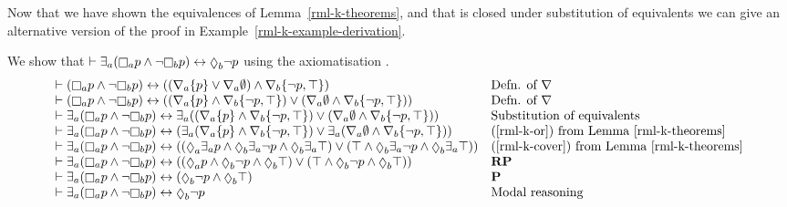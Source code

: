 Now that we have shown the equivalences of Lemma~\ref{rml-k-theorems}, and that \axiomRmlK{} is closed under substitution of equivalents we can give an alternative version of the proof in Example~\ref{rml-k-example-derivation}.

\begin{example}
We show that $\proves \somerefsA (\necessaryA \atomP \land \lnot \necessaryB \atomP) \iff \possibleB \lnot \atomP$ using the axiomatisation \axiomRmlK{}.
$$
\begin{array}{ll}
    \proves (\necessaryA \atomP \land \lnot \necessaryB \atomP) \iff ((\coversA \{\atomP\} \lor \coversA \emptyset) \land \coversB \{\lnot \atomP, \top\}) & \text{Defn. of $\covers$}\\
    \proves (\necessaryA \atomP \land \lnot \necessaryB \atomP) \iff ((\coversA \{\atomP\} \land \coversB \{\lnot \atomP, \top\}) \lor (\coversA \emptyset \land \coversB \{\lnot \atomP, \top\})) & \text{Defn. of $\covers$}\\
    \proves \somerefsA (\necessaryA \atomP \land \lnot \necessaryB \atomP) \iff \somerefsA ((\coversA \{\atomP\} \land \coversB \{\lnot \atomP, \top\}) \lor (\coversA \emptyset \land \coversB \{\lnot \atomP, \top\})) & \text{Substitution of equivalents}\\
    \proves \somerefsA (\necessaryA \atomP \land \lnot \necessaryB \atomP) \iff (\somerefsA (\coversA \{\atomP\} \land \coversB \{\lnot \atomP, \top\}) \lor \somerefsA (\coversA \emptyset \land \coversB \{\lnot \atomP, \top\})) & \text{(\ref{rml-k-or}) from Lemma~\ref{rml-k-theorems}}\\
    \proves \somerefsA (\necessaryA \atomP \land \lnot \necessaryB \atomP) \iff ((\possibleA \somerefsA \atomP \land \possibleB \somerefsA \lnot \atomP \land \possibleB \somerefsA \top) \lor (\top \land \possibleB \somerefsA \lnot \atomP \land \possibleB \somerefsA \top)) & \text{(\ref{rml-k-cover}) from Lemma~\ref{rml-k-theorems}}\\
    \proves \somerefsA (\necessaryA \atomP \land \lnot \necessaryB \atomP) \iff ((\possibleA \atomP \land \possibleB \lnot \atomP \land \possibleB \top) \lor (\top \land \possibleB \lnot \atomP \land \possibleB \top)) & {\bf RP}\\
    \proves \somerefsA (\necessaryA \atomP \land \lnot \necessaryB \atomP) \iff (\possibleB \lnot \atomP \land \possibleB \top) & {\bf P}\\
    \proves \somerefsA (\necessaryA \atomP \land \lnot \necessaryB \atomP) \iff \possibleB \lnot \atomP & \text{Modal reasoning}\\
\end{array}
$$
\end{example}

